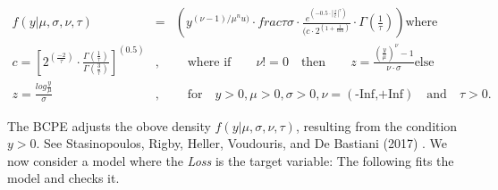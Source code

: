 \documentclass[]{DissertateUSU}
\begin{document}
\begin{eqnarray}
f(y|\mu,\sigma,\nu,\tau)&=&(y^{(\nu-1)/\mu^nu)}\cdot{frac{\tau}{\sigma}}\cdot \frac{e^(-0.5\cdot|\frac{z}{c}|^\tau)}{(c\cdot 2^(1+\frac{1}{tau})}\cdot \Gamma(\frac{1}{\tau}))\mbox{where}\\
 c=[2^(\frac{-2}{\tau})\cdot \frac{\Gamma(\frac{1}{\tau})}{\Gamma(\frac{3}{\tau})}]^(0.5)&,& \quad \mbox{where if} \qquad \nu!=0 \quad \mbox{then} \qquad z=\frac{(\frac{y}{\mu})^\nu-1}{\nu\cdot \sigma}\mbox{else}\\
 z=\frac{log\frac{y}{\mu}}{\sigma}&,& \quad \mbox{for} \quad y>0, \mu>0, \sigma>0, \nu=(\mbox{-Inf,+Inf})\quad \mbox{and}\quad \tau>0.
\end{eqnarray}

\doublespacing

The BCPE adjusts the obove density \(f(y|\mu,\sigma,\nu,\tau)\),
resulting from the condition \(y>0\). See Stasinopoulos, Rigby, Heller,
Voudouris, and De Bastiani (2017) . We now consider a model where the
\emph{Loss} is the target variable: The following fits the model and
checks it.\medskip

\singlespacing

\doublespacing

\singlespacing
\end{document}
